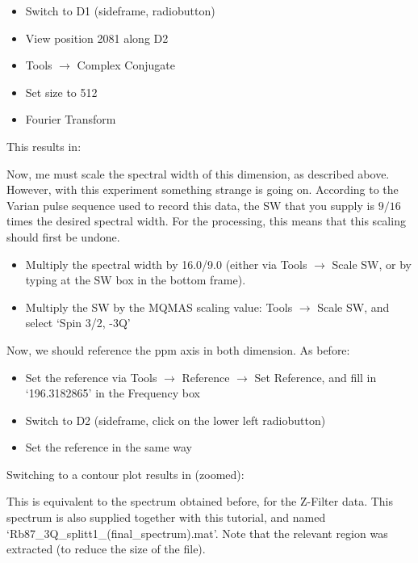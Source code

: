 \documentclass[11pt,a4paper]{article}
\begin{document}
\begin{itemize}
	\item Switch to D1 (sideframe, radiobutton)
	\item View position 2081 along D2
	\item Tools $\longrightarrow$  Complex Conjugate
	\item Set size to 512
	\item Fourier Transform
\end{itemize}
This results in:
\begin{center}
\end{center}

Now, me must scale the spectral width of this dimension, as described above.
However, with this experiment something strange is going on.
According to the Varian pulse sequence used to record this data, the SW that you supply is $9/16$ times the desired spectral width.
For the processing, this means that this scaling should first be undone.

\begin{itemize}
	\item Multiply the spectral width by 16.0/9.0 (either via Tools  $\longrightarrow$ Scale SW, or
	  by typing at the SW box in the bottom frame).
	\item Multiply the SW by the MQMAS scaling value: Tools  $\longrightarrow$ Scale SW, and select `Spin 3/2, -3Q'
\end{itemize}
Now, we should reference the ppm axis in both dimension.
As before:
\begin{itemize}
  \item Set the reference via Tools $\longrightarrow$ Reference $\longrightarrow$ Set Reference, and
	 fill in `196.3182865' in the Frequency box
	\item Switch to D2 (sideframe, click on the lower left radiobutton)
	\item Set the reference in the same way
\end{itemize}
Switching to a contour plot results in (zoomed):
\begin{center}
\end{center}
This is equivalent to the spectrum obtained before, for the Z-Filter data.
This spectrum is also supplied together with this tutorial, and named `Rb87\_3Q\_splitt1\_(final\_spectrum).mat'.
Note that the relevant region was extracted (to reduce the size of the file).
\end{document}
